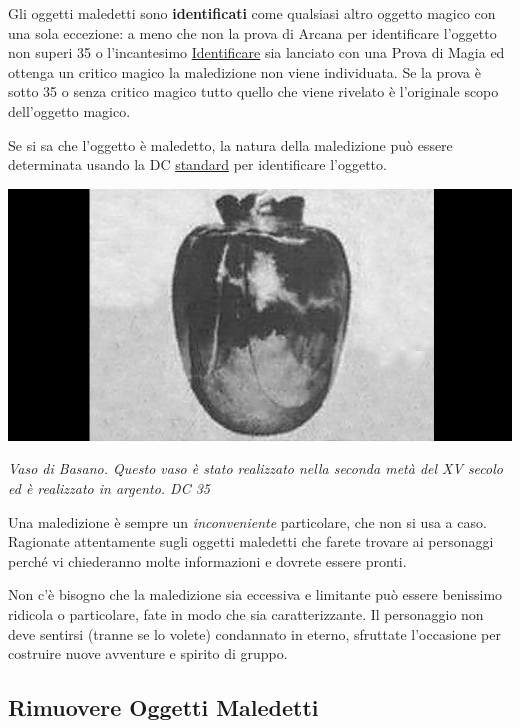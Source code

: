 \begin{multicols}{2}
\medskip

Gli oggetti maledetti sono \hypertarget{oggettimaledettiid}{\textbf{identificati}}\label{oggettimaledettiid} come qualsiasi altro oggetto magico con una sola eccezione: a meno che non la prova di Arcana per identificare l'oggetto non superi 35 o l'incantesimo \hyperlink{Identificare}{Identificare} sia lanciato con una Prova di Magia ed ottenga un critico magico la maledizione non viene individuata. Se la prova è sotto 35 o senza critico magico tutto quello che viene rivelato è l'originale scopo dell'oggetto magico.

Se si sa che l'oggetto è maledetto, la natura della maledizione può essere determinata usando la DC \hyperlink{identificareom}{standard} per identificare l'oggetto.

\begin{center}
\includegraphics[width=0.75\linewidth]{immagini/vasobasano.png}

\emph{Vaso di Basano. Questo vaso è stato realizzato nella seconda metà del XV secolo ed è realizzato in argento. DC 35}
\end{center}

\begin{changemargin}{0.3cm}{0.3cm}\begin{narratore}
Una maledizione è sempre un \emph{inconveniente} particolare, che non si usa a caso. Ragionate attentamente sugli oggetti maledetti che farete trovare ai personaggi perché vi chiederanno molte informazioni e dovrete essere pronti.

Non c'è bisogno che la maledizione sia eccessiva e limitante può essere benissimo ridicola o particolare, fate in modo che sia caratterizzante. Il personaggio non deve sentirsi (tranne se lo volete) condannato in eterno, sfruttate l'occasione per costruire nuove avventure e spirito di gruppo.
\end{narratore}\end{changemargin}

\subsection{Rimuovere Oggetti Maledetti}


\end{multicols}
